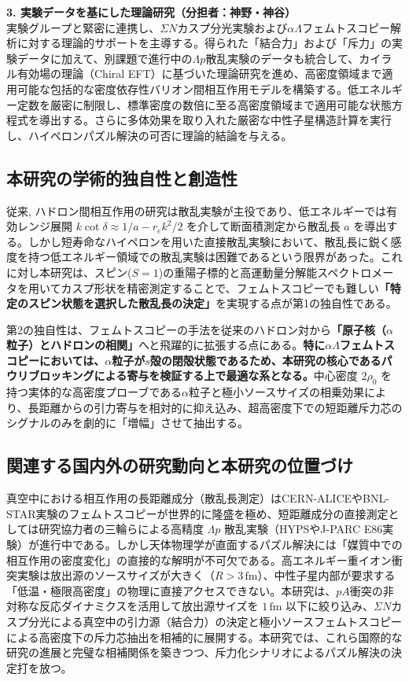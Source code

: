 \documentclass[11pt,a4j,dvipdfmx]{jarticle} 					%
\newcommand{\研究課題名}{加速器実験による短距離バリオン間相互作用の解明と中性子星ハイペロンパズルの解決}
\newcommand{\研究機関名}{東北大学}
\newcommand{\研究代表者氏名}{市川裕大}
\newcommand{\研究期間の最終元号年度}{13}
\begin{document}
\vspace*{1.5zw}
\noindent
\textbf{3. 実験データを基にした理論研究（分担者：神野・神谷）}\\
実験グループと緊密に連携し、$\Sigma N$カスプ分光実験および$\alpha\Lambda$フェムトスコピー解析に対する理論的サポートを主導する。得られた「結合力」および「斥力」の実験データに加えて、別課題で進行中の$\Lambda p$散乱実験のデータも統合して、カイラル有効場の理論（Chiral EFT）に基づいた理論研究を進め、高密度領域まで適用可能な包括的な密度依存性バリオン間相互作用モデルを構築する。低エネルギー定数を厳密に制限し、標準密度の数倍に至る高密度領域まで適用可能な状態方程式を導出する。さらに多体効果を取り入れた厳密な中性子星構造計算を実行し、ハイペロンパズル解決の可否に理論的結論を与える。

\subsection{本研究の学術的独自性と創造性}
従来, ハドロン間相互作用の研究は散乱実験が主役であり、低エネルギーでは有効レンジ展開 $k\cot\delta \approx 1/a - r_e k^2 / 2$ を介して断面積測定から散乱長 $a$ を導出する。しかし短寿命なハイペロンを用いた直接散乱実験において、散乱長に鋭く感度を持つ低エネルギー領域での散乱実験は困難であるという限界があった。これに対し本研究は、スピン($S = 1$)の重陽子標的と高運動量分解能スペクトロメータを用いてカスプ形状を精密測定することで、フェムトスコピーでも難しい\textbf{「特定のスピン状態を選択した散乱長の決定」}を実現する点が第1の独自性である。

第2の独自性は、フェムトスコピーの手法を従来のハドロン対から\textbf{「原子核（$\alpha$粒子）とハドロンの相関」}へと飛躍的に拡張する点にある。\textbf{特に$\alpha\Lambda$フェムトスコピーにおいては、$\alpha$粒子が$s$殻の閉殻状態であるため、本研究の核心であるパウリブロッキングによる寄与を検証する上で最適な系となる。}中心密度 $2\rho_0$ を持つ実体的な高密度プローブである$\alpha$粒子と極小ソースサイズの相乗効果により、長距離からの引力寄与を相対的に抑え込み、超高密度下での短距離斥力芯のシグナルのみを劇的に「増幅」させて抽出する。

\subsection{関連する国内外の研究動向と本研究の位置づけ}
真空中における相互作用の長距離成分（散乱長測定）はCERN-ALICEやBNL-STAR実験のフェムトスコピーが世界的に隆盛を極め、短距離成分の直接測定としては研究協力者の三輪らによる高精度 $\Lambda p$ 散乱実験（HYPSやJ-PARC E86実験）が進行中である。しかし天体物理学が直面するパズル解決には「媒質中での相互作用の密度変化」の直接的な解明が不可欠である。高エネルギー重イオン衝突実験は放出源のソースサイズが大きく（$R > 3\,\text{fm}$）、中性子星内部が要求する「低温・極限高密度」の物理に直接アクセスできない。本研究は、$pA$衝突の非対称な反応ダイナミクスを活用して放出源サイズを $1\,\text{fm}$ 以下に絞り込み、$\Sigma N$カスプ分光による真空中の引力源（結合力）の決定と極小ソースフェムトスコピーによる高密度下の斥力芯抽出を相補的に展開する。本研究では、これら国際的な研究の進展と完璧な相補関係を築きつつ、斥力化シナリオによるパズル解決の決定打を放つ。
\end{document}
